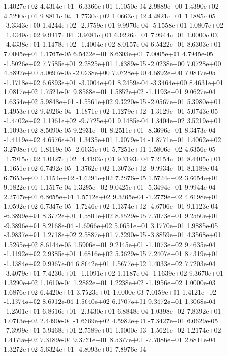  1.4027e+02  4.4314e+01 -6.3366e+01  1.1050e-04
2.9889e+00 1.4390e+02 4.5290e+01  9.8811e-04
-1.7730e+02  1.0663e+02  4.4821e+01  1.1885e-05
-3.3343e+00  1.4244e+02 -2.9759e+01  9.9970e-04
-5.1558e+01  1.0807e+02 -1.4349e+02  9.9917e-04
-3.9381e+01  6.9226e+01  7.9944e+01  1.0000e-03
-4.4338e+01  1.1478e+02 -1.4004e+02  8.0157e-04
6.5422e+01 8.6303e+01 7.0005e+01  1.1767e-05
6.5422e+01 8.6303e+01 7.0005e+01  4.7945e-05
-1.5026e+02  7.7585e+01  2.2825e+01  1.6389e-05
-2.0238e+00  7.0728e+00  4.5892e+00  5.0697e-05
-2.0238e+00  7.0728e+00  4.5892e+00  7.0817e-05
-1.1718e+02  6.6893e+01 -3.0004e+01  8.2459e-04
-3.3464e+00  8.4631e+01  1.0817e+02  1.7521e-04
 9.8588e+01  1.5852e+02 -1.1193e+01  9.0627e-04
 1.6354e+02  5.9848e+01 -1.5561e+02  9.3220e-05
-2.0567e+01  5.3980e+01  1.4953e+02  9.4926e-04
-1.1871e+02  1.1279e+02 -1.3129e+01  5.0743e-05
-1.4402e+02  1.1961e+02 -9.7725e+01  9.1485e-04
1.3404e+02 3.5219e+01 1.1093e+02  8.5090e-05
 9.2931e+01  8.2511e+01 -8.3696e+01  8.3473e-04
-1.4119e+02  4.6676e+01  1.3435e+01  1.0079e-04
-1.8771e+01  1.4062e+02  3.2708e+01  1.8119e-05
-2.6035e+01  5.7251e+01  1.5806e+02  4.6356e-05
-1.7915e+02  1.0927e+02 -4.4193e+01  9.3193e-04
7.2154e+01 8.4405e+01 1.1651e+02  6.7492e-05
-1.3762e+02  1.3073e+02 -9.9934e+01  8.1189e-04
 6.7653e+00  1.1154e+02 -1.6291e+02  7.2876e-05
1.5724e+02 3.6654e+01 9.1822e+01  1.1517e-04
 1.3295e+02  9.0425e+01 -5.3494e+01  9.9944e-04
2.2747e+01 6.8655e+01 1.5712e+02  9.3265e-04
-1.2779e+02  4.6198e+01  1.0592e+02  6.7347e-05
-1.7246e+02  1.1374e+02 -4.6706e+01  9.1123e-04
-6.3899e+01  8.3772e+01  1.5801e+02  8.8529e-05
 7.7073e+01  9.2550e+01 -9.3896e+01  8.2168e-04
-1.6966e+02  5.0651e+01  3.1770e+01  1.9885e-05
-3.9837e+01  1.2718e+02  2.5887e+01  7.2290e-05
-3.8859e+01  4.3568e+01  1.5265e+02  8.6144e-05
 1.5906e+01  9.2145e+01 -1.1073e+02  9.4635e-04
-1.1192e+02  2.9385e+01  1.6816e+02  5.3629e-05
 7.2407e+01  8.4319e+01 -1.1384e+02  9.9967e-04
6.8642e+01 1.5677e+02 1.4033e+02  7.7203e-04
-3.4079e+01  7.4230e+01 -1.1091e+02  1.1187e-04
-1.1639e+02  9.3670e+01  1.3290e+02  1.1610e-04
 1.2882e+01  1.2238e+02 -1.1956e+02  1.0000e-03
1.6876e+02 6.4420e+01 3.7523e+01  1.0000e-03
 7.0159e+01  1.4121e+02 -1.1374e+02  8.6912e-04
1.5640e+02 6.1707e+01 9.3472e+01  1.3068e-04
-1.2501e+01  6.8616e+01 -2.3430e+01  6.8848e-04
1.0398e+02 7.8392e+01 1.0713e+02  2.4490e-04
-1.6369e+02  4.5982e+01 -7.3427e+01  6.6629e-05
-7.3999e+01  5.9468e+01  2.7589e+01  1.0000e-03
-1.5621e+02  1.2174e+02  1.4179e+02  7.3189e-04
 9.3721e+01  8.5377e+01 -7.7086e+01  2.6811e-04
 1.3272e+02  5.6324e+01 -4.8093e+01  7.8976e-04

